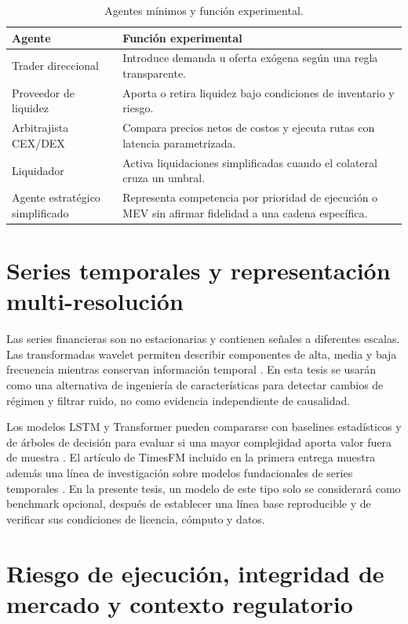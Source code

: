 \begin{table}[H]
\centering
\caption{Agentes mínimos y función experimental.}
\begin{tabularx}{\textwidth}{p{3.6cm}X}
\toprule
\textbf{Agente} & \textbf{Función experimental} \\
\midrule
Trader direccional & Introduce demanda u oferta exógena según una regla transparente. \\
Proveedor de liquidez & Aporta o retira liquidez bajo condiciones de inventario y riesgo. \\
Arbitrajista CEX/DEX & Compara precios netos de costos y ejecuta rutas con latencia parametrizada. \\
Liquidador & Activa liquidaciones simplificadas cuando el colateral cruza un umbral. \\
Agente estratégico simplificado & Representa competencia por prioridad de ejecución o MEV sin afirmar fidelidad a una cadena específica. \\
\bottomrule
\end{tabularx}
\end{table}

\section{Series temporales y representación multi-resolución}

Las series financieras son no estacionarias y contienen señales a diferentes escalas. Las transformadas wavelet permiten describir componentes de alta, media y baja frecuencia mientras conservan información temporal \cite{gencay2002wavelets}. En esta tesis se usarán como una alternativa de ingeniería de características para detectar cambios de régimen y filtrar ruido, no como evidencia independiente de causalidad.

Los modelos LSTM y Transformer pueden compararse con baselines estadísticos y de árboles de decisión para evaluar si una mayor complejidad aporta valor fuera de muestra \cite{fischer2018deep,vaswani2017attention}. El artículo de TimesFM incluido en la primera entrega muestra además una línea de investigación sobre modelos fundacionales de series temporales \cite{das2024timesfm}. En la presente tesis, un modelo de este tipo solo se considerará como benchmark opcional, después de establecer una línea base reproducible y de verificar sus condiciones de licencia, cómputo y datos.

\section{Riesgo de ejecución, integridad de mercado y contexto regulatorio}

